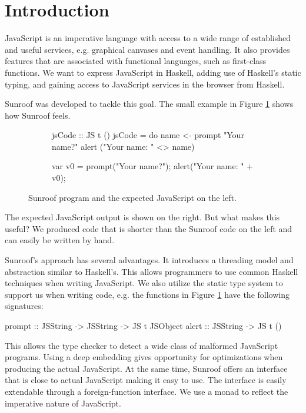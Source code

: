  
\section{Introduction}

JavaScript is an imperative language with access to a wide range
of established and useful services, e.g. graphical canvases and event
handling. It also provides features that are associated with 
functional languages, such as first-class functions. 
We want to express JavaScript in Haskell, adding use
of Haskell's static typing, and gaining access to JavaScript services
in the browser from Haskell.

Sunroof was developed to tackle this goal.
The small example in Figure \ref{fig:code-example} 
shows how Sunroof feels.
\begin{figure}[h]
\vspace{-0.5cm}
\centering
\begin{subfigure}{0.45\textwidth}%
\begin{Code}
 jsCode :: JS t ()
 jsCode = do
   name <- prompt "Your name?"
   alert ("Your name: " <> name)
\end{Code}%
\end{subfigure}%
\hfill%
\begin{subfigure}{0.45\textwidth}
\vspace{0.25cm}%
\begin{Code}
  
  
var v0 = prompt("Your name?"); 
alert("Your name: " + v0);
\end{Code}%
\end{subfigure}%
\caption{Sunroof program and the expected JavaScript on the left.}%
\label{fig:code-example}%
\vspace{-0.5cm}
\end{figure}
The expected JavaScript output is shown on the right. But what makes 
this useful? We produced code that is shorter 
than the Sunroof code on the left and can easily be written by hand.

Sunroof's approach has several advantages. 
It introduces a threading model and abstraction similar
to Haskell's. This allows programmers to use common Haskell 
techniques when writing JavaScript.
We also utilize the static type system to support us when 
writing code, e.g. the functions
in Figure \ref{fig:code-example} have the following signatures:
\begin{Code}
prompt :: JSString -> JSString -> JS t JSObject
alert  :: JSString -> JS t ()
\end{Code}
This allows the type checker to detect a wide class
of malformed JavaScript programs.
Using a deep embedding gives opportunity 
for optimizations when producing the actual JavaScript.
At the same time, Sunroof offers an interface that is 
close to actual JavaScript making it easy to use.
The interface is easily extendable through
a foreign-function interface.
We use a monad \cite{Moggi:91:ComputationMonads} 
to reflect the imperative nature of JavaScript.

